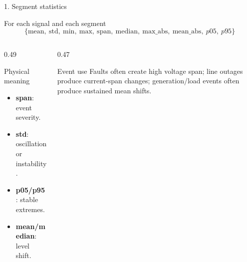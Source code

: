 \documentclass[10pt,aspectratio=169]{beamer}
\begin{document}
\begin{frame}{1. Segment statistics}
\small
\begin{block}{For each signal and each segment}
\[
\{\mathrm{mean},\ \mathrm{std},\ \mathrm{min},\ \mathrm{max},\ \mathrm{span},\ 
\mathrm{median},\ \mathrm{max\_abs},\ \mathrm{mean\_abs},\ p05,\ p95\}
\]
\end{block}
\begin{columns}[T,totalwidth=\textwidth]
\begin{column}{0.49\textwidth}
\begin{exampleblock}{Physical meaning}
\begin{itemize}
  \item \textbf{span}: event severity.
  \item \textbf{std}: oscillation or instability.
  \item \textbf{p05/p95}: stable extremes.
  \item \textbf{mean/median}: level shift.
\end{itemize}
\end{exampleblock}
\end{column}
\begin{column}{0.47\textwidth}
\begin{alertblock}{Event use}
Faults often create high voltage span; line outages produce current-span changes; generation/load events often produce sustained mean shifts.
\end{alertblock}
\end{column}
\end{columns}
\end{frame}
\end{document}

